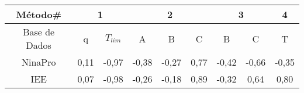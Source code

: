 \begin{table}[htb]
{
	\begin{tabular}{c|cc|ccc|cc|c}
		\toprule
		Método\# & \multicolumn{2}{c}{1} & \multicolumn{3}{c}{2} & \multicolumn{2}{c}{3} & 4\\
		\midrule
		Base de Dados	&q&$T_{lim}$&A&B&C&B&C&T \\
		\midrule \midrule					
		 NinaPro & 0,11	& -0,97 & -0,38 & -0,27  & 0,77  & -0,42 & -0,66 & -0,35\\
		 IEE	 & 	0,07& -0,98 & -0,26 & -0,18 & 0,89 & -0,32 & 0,64  & 0,80\\
	\end{tabular}
}{}
\end{table}